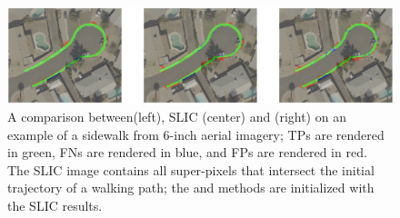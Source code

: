 \begin{figure}[tb]
    \centering
    \includegraphics[width=0.95\columnwidth]{Figures/compare.png}
    \caption[Method comparison with \GrabCut{}, Active Contours, and \ac{SLIC}]{
        A comparison between\GrabCut{}(left), \ac{SLIC} (center) and \ActiveContours{} (right) 
        on an example of a sidewalk from 6-inch aerial imagery; 
        \aclp{TP} are rendered in green, 
        \aclp{FN} are rendered in blue, and 
        \aclp{FP} are rendered in red.  The \ac{SLIC} image contains all super-pixels that intersect the initial trajectory of a walking path; the \ActiveContours{} and \GrabCut{} methods are initialized with the \ac{SLIC} results.  
    }
    \label{fig:Method_comparison}
\end{figure}




